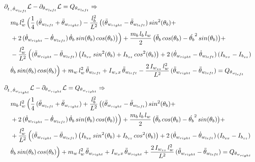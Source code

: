 \documentclass[11pt]{article}
\begin{document}
\[
  \mathrm{
    \begin{aligned}
      & \partial_{t \, , \, \dot{\theta}_{w_{left}}} \mathcal{L} - \partial_{\theta_{w_{left}}} \mathcal{L} = Q_{\theta_{w_{left}}} \Rightarrow \\
      & \quad m_b \, l_w^2 \, \Bigl( \frac{1}{4} \, ( \ddot{\theta}_{w_{left}} + \ddot{\theta}_{w_{right}} ) - \frac{l_b^2}{L^2} \, \bigl( ( \ddot{\theta}_{w_{right}} - \ddot{\theta}_{w_{left}} ) \, sin^2(\theta_b) + \\
      & \quad + 2 \, ( \dot{\theta}_{w_{right}} - \dot{\theta}_{w_{left}} ) \, \dot{\theta}_b \, sin(\theta_b) \, cos(\theta_b) \bigl) \Bigr) + \frac{m_b \, l_b \, l_w}{2} \, \bigl( \ddot{\theta}_b \, cos(\theta_b) - \dot{\theta_b}^2 \, sin(\theta_b) \bigr) + \\
      & \quad - \frac{l_w^2}{L^2} \, \Bigl( ( \ddot{\theta}_{w_{right}} - \ddot{\theta}_{w_{left}} ) \, \bigl( I_{b_{xx}} \, sin^2(\theta_b) + I_{b_{zz}} \, cos^2(\theta_b) \bigr) + 2 \, ( \dot{\theta}_{w_{right}} - \dot{\theta}_{w_{left}} ) \, ( I_{b_{xx}} - I_{b_{zz}} ) \\
      & \quad \dot{\theta}_b \, sin(\theta_b) \, cos(\theta_b) \Bigr) + m_w \, l_w^2 \, \ddot{\theta}_{w_{left}} + I_{w_xx} \, \ddot{\theta}_{w_{left}} - \frac{2 \, I_{w_{zz}} \, l_w^2}{L^2} \, ( \ddot{\theta}_{w_{right}} - \ddot{\theta}_{w_{left}} ) = Q_{\theta_{w_{left}}}
    \end{aligned}
  }
\]

\[
  \mathrm{
    \begin{aligned}
      & \partial_{t \, , \, \dot{\theta}_{w_{right}}} \mathcal{L} - \partial_{\theta_{w_{right}}} \mathcal{L} = Q_{\theta_{w_{right}}} \Rightarrow \\
      & \quad m_b \, l_w^2 \, \Bigl( \frac{1}{4} \, ( \ddot{\theta}_{w_{left}} + \ddot{\theta}_{w_{right}} ) + \frac{l_b^2}{L^2} \, \bigl( ( \ddot{\theta}_{w_{right}} - \ddot{\theta}_{w_{left}} ) \, sin^2(\theta_b) + \\
      & \quad + 2 \, ( \dot{\theta}_{w_{right}} - \dot{\theta}_{w_{left}} ) \, \dot{\theta}_b \, sin(\theta_b) \, cos(\theta_b) \bigl) \Bigr) + \frac{m_b \, l_b \, l_w}{2} \, \bigl( \ddot{\theta}_b \, cos(\theta_b) - \dot{\theta_b}^2 \, sin(\theta_b) \bigr) + \\
      & \quad + \frac{l_w^2}{L^2} \, \Bigl( ( \ddot{\theta}_{w_{right}} - \ddot{\theta}_{w_{left}} ) \, \bigl( I_{b_{xx}} \, sin^2(\theta_b) + I_{b_{zz}} \, cos^2(\theta_b) \bigr) + 2 \, ( \dot{\theta}_{w_{right}} - \dot{\theta}_{w_{left}} ) \, ( I_{b_{xx}} - I_{b_{zz}} ) \\
      & \quad \dot{\theta}_b \, sin(\theta_b) \, cos(\theta_b) \Bigr) + m_w \, l_w^2 \, \ddot{\theta}_{w_{right}} + I_{w_xx} \, \ddot{\theta}_{w_{right}} + \frac{2 \, I_{w_{zz}} \, l_w^2}{L^2} \, ( \ddot{\theta}_{w_{right}} - \ddot{\theta}_{w_{left}} ) = Q_{\theta_{w_{right}}}
    \end{aligned}
  }
\]
\end{document}
